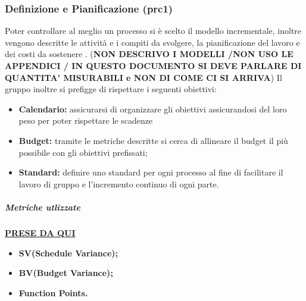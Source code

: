 \subsubsection{Definizione e Pianificazione (prc1)}
Poter controllare al meglio un processo si è scelto il modello incrementale, inoltre vengono descritte le attività e i compiti da svolgere, la pianificazione del lavoro e dei costi da sostenere . (\textbf{NON DESCRIVO I MODELLI /NON USO LE APPENDICI / IN QUESTO DOCUMENTO SI DEVE PARLARE DI QUANTITA' MISURABILI e NON DI COME CI SI ARRIVA}) Il gruppo inoltre si prefigge di rispettare i seguenti obiettivi:
\begin{itemize}
		\item{\textbf{Calendario:} assicurarsi di organizzare gli obiettivi assicurandosi del loro peso per poter rispettare le scadenze}
		\item{\textbf{Budget:} tramite le metriche descritte si cerca di allineare il budget il più possibile con gli obiettivi prefissati;}
		\item{\textbf{Standard:} definire uno standard per ogni processo al fine di facilitare il lavoro di gruppo e l'incremento continuo di ogni parte.}
\end{itemize} 
\subparagraph{Metriche utlizzate}
\href{https://it.wikipedia.org/wiki/Metriche_di_progetto}{\textbf{PRESE DA QUI}}
\begin{itemize}
	\item{\textbf{SV(Schedule Variance);}}
	\item{\textbf{BV(Budget Variance);}}
	\item{\textbf{Function Points.} }
\end{itemize}
\begin{table}[!htpb]
	\centering
	\renewcommand{\arraystretch}{2} 
	\caption{Metriche utilizzate per la Definizione e Pianificazione}
\end{table}

